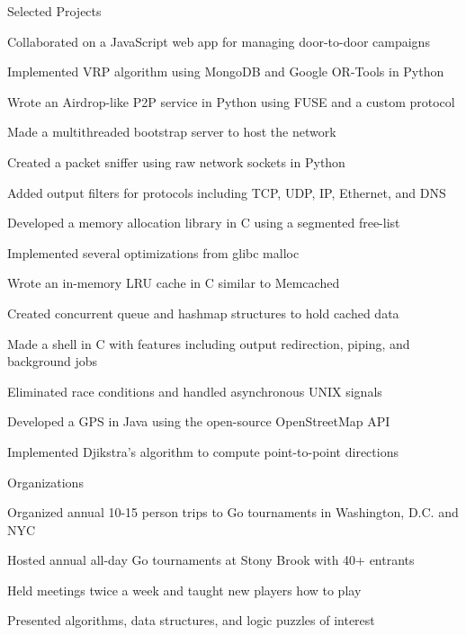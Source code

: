 \documentclass{cv}
\begin{document}
\begin{cvsection}{Selected Projects}
  {
    \item Collaborated on a JavaScript web app for managing door-to-door campaigns
    \item Implemented VRP algorithm using MongoDB and Google OR-Tools in Python
  }
  {
    \item Wrote an Airdrop-like P2P service in Python using FUSE and a custom protocol
    \item Made a multithreaded bootstrap server to host the network
  }
  {
    \item Created a packet sniffer using raw network sockets in Python
    \item Added output filters for protocols including TCP, UDP, IP, Ethernet, and DNS
  }
  {
    \item Developed a memory allocation library in C using a segmented free-list
    \item Implemented several optimizations from glibc malloc
  }
  {
    \item Wrote an in-memory LRU cache in C similar to Memcached
    \item Created concurrent queue and hashmap structures to hold cached data
  }
  {
    \item Made a shell in C with features including output redirection, piping, and background jobs
    \item Eliminated race conditions and handled asynchronous UNIX signals
  }
  {
    \item Developed a GPS in Java using the open-source OpenStreetMap API
    \item Implemented Djikstra's algorithm to compute point-to-point directions
  }
\end{cvsection}

\begin{cvsection}{Organizations}
  {
    \item Organized annual 10-15 person trips to Go tournaments in Washington, D.C. and NYC
    \item Hosted annual all-day Go tournaments at Stony Brook with 40+ entrants
    \item Held meetings twice a week and taught new players how to play
  }
  {
    \item Presented algorithms, data structures, and logic puzzles of interest
  }
\end{cvsection}
\end{document}
